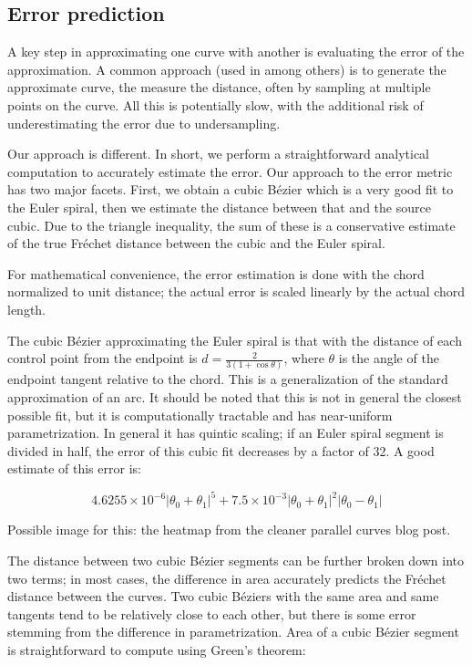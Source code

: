 \documentclass[format=acmsmall]{acmart}
\begin{document}
\subsection{Error prediction}

A key step in approximating one curve with another is evaluating the error of the approximation. A common approach (used in \cite{Nehab2020} among others) is to generate the approximate curve, the measure the distance, often by sampling at multiple points on the curve. All this is potentially slow, with the additional risk of underestimating the error due to undersampling.

Our approach is different. In short, we perform a straightforward analytical computation to accurately estimate the error. Our approach to the error metric has two major facets. First, we obtain a cubic Bézier which is a very good fit to the Euler spiral, then we estimate the distance between that and the source cubic. Due to the triangle inequality, the sum of these is a conservative estimate of the true Fréchet distance between the cubic and the Euler spiral.

For mathematical convenience, the error estimation is done with the chord normalized to unit distance; the actual error is scaled linearly by the actual chord length.

The cubic Bézier approximating the Euler spiral is that with the distance of each control point from the endpoint is $d = \frac{2}{3(1 + \cos \theta)}$, where $\theta$ is the angle of the endpoint tangent relative to the chord. This is a generalization of the standard approximation of an arc. It should be noted that this is not in general the closest possible fit, but it is computationally tractable and has near-uniform parametrization. In general it has quintic scaling; if an Euler spiral segment is divided in half, the error of this cubic fit decreases by a factor of 32. A good estimate of this error is:

\[
    4.6255\times10^{-6}|\theta_0+\theta_1|^5 + 7.5\times10^{-3}|\theta_0+\theta_1|^2|\theta_0-\theta_1|
\]

Possible image for this: the heatmap from the cleaner parallel curves blog post.

The distance between two cubic Bézier segments can be further broken down into two terms; in most cases, the difference in area accurately predicts the Fréchet distance between the curves. Two cubic Béziers with the same area and same tangents tend to be relatively close to each other, but there is some error stemming from the difference in parametrization. Area of a cubic Bézier segment is straightforward to compute using Green's theorem:
\end{document}

